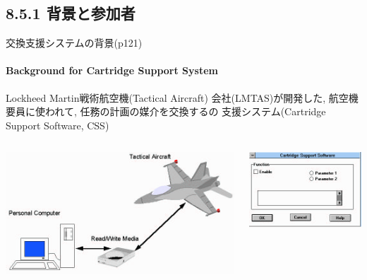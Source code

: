 \subsection{8.5.1 背景と参加者}
\begin{frame}{交換支援システムの背景(p121)}
\framesubtitle{Background for Cartridge Support System}
Lockheed Martin戦術航空機(Tactical Aircraft)
会社(LMTAS)が開発した, 航空機要員に使われて, 任務の計画の媒介を交換するの
支援システム(Cartridge Support Software, CSS)

\begin{columns}
\begin{column}{0.6\textwidth}
\begin{center}
\includegraphics[width=\textwidth,height=0.5\textheight,keepaspectratio]{figure/CSS.png}
\end{center}
\end{column}
\begin{column}{0.4\textwidth}
\begin{center}
\includegraphics[width=\textwidth,height=0.5\textheight,keepaspectratio]{figure/CSSdialog.png}
\end{center}
\end{column}
\end{columns}


\end{frame}
